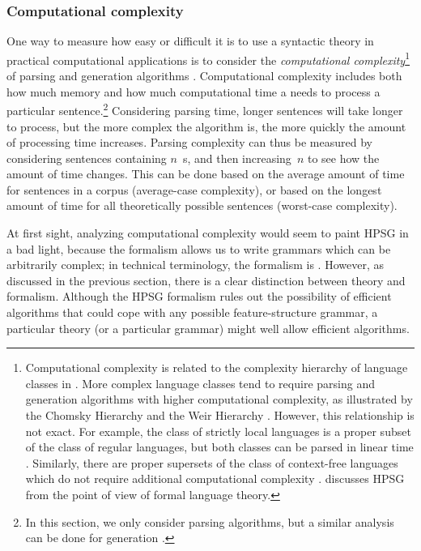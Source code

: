 \documentclass[output=paper
 	        ,biblatex
                ,babelshorthands
                ,newtxmath
                ,draftmode
                ,colorlinks, citecolor=brown
]{langscibook}
\begin{document}
\subsubsection{Computational complexity}
\label{cl:prac:comp}


One way to measure how easy or difficult it is
to use a syntactic theory in practical computational applications
is to consider the \textit{computational complexity}\footnote{%
	Computational complexity is related to
	the complexity hierarchy of language classes in .
	More complex language classes tend to require
	parsing and generation algorithms with higher computational complexity,
	as illustrated by the Chomsky Hierarchy \citep{Chomsky63a-u,hopcroft1969automata}
	and the Weir Hierarchy \citep{weir1992hierarchy}.
	However, this relationship is not exact.
	For example, the class of strictly local languages is a proper subset of the class of regular languages,
	but both classes can be parsed in linear time \citep{jaeger2012hierarchy}.
	Similarly, there are proper supersets of the class of context-free languages
	which do not require additional computational complexity \citep{boullier1999cubic}.
	\citet[Chapter 17]{MuellerGT-Eng3} discusses HPSG from the point of view of formal language theory.
}
of parsing and generation algorithms \citep{gazdar1985complexity}.
Computational complexity includes both how much memory
and how much computational time
a  needs to process a particular sentence.\footnote{%
  In this section, we only consider parsing
  algorithms, but a similar analysis can be done for generation
  \citep[\eg][]{carroll1999generate}.}
Considering parsing time, longer sentences will take longer to process,
but the more complex the algorithm is,
the more quickly the amount of processing time increases.
Parsing complexity can thus be measured by considering
sentences containing $n$~s,
and then increasing~$n$ to see how the amount of time changes.
This can be done based on the average amount of time
for sentences in a corpus (average-case complexity),
or based on the longest amount of time
for all theoretically possible sentences (worst-case complexity).

At first sight, analyzing computational complexity
would seem to paint HPSG in a bad light,
because the formalism allows us to write grammars
which can be arbitrarily complex;
in technical terminology, the formalism is \textit{}
\citep[Section~3.4]{Johnson88}.
However, as discussed in the previous section,
there is a clear distinction between theory and formalism.
Although the HPSG formalism rules out the possibility of efficient algorithms
that could cope with any possible feature-structure grammar,
a particular theory (or a particular grammar) might well allow efficient algorithms.
\end{document}
